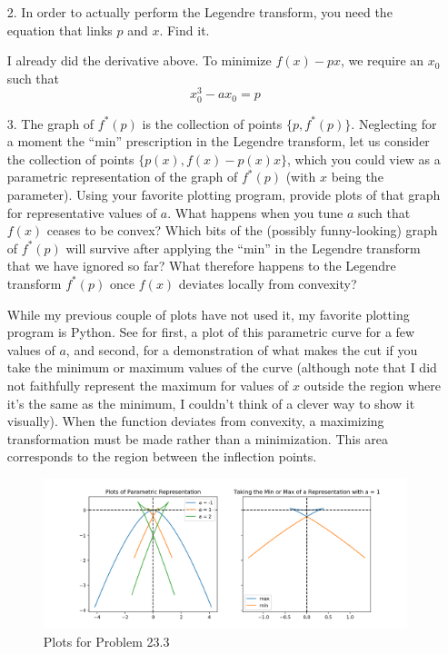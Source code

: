 \documentclass[a4paper,twoside]{article}
\begin{document}
\begin{itemize}
    \item[2.] In order to actually perform the Legendre transform, you need the equation that links $ p $ and $ x $. Find it.
        \begin{problem}
            I already did the derivative above. To minimize $ f(x) - px $, we require an $ x_0 $ such that
            \begin{equation}
                x_0^3 - a x_0 = p
            \end{equation}
        \end{problem}
        
    \item[3.] The graph of $ f^*(p) $ is the collection of points $ \{p, f^*(p)\} $. Neglecting for a moment the ``min'' prescription in the Legendre transform, let us consider the collection of points $ \{p(x), f(x) - p(x) x\} $, which you could view as a parametric representation of the graph of $ f^*(p) $ (with $ x $ being the parameter). Using your favorite plotting program, provide plots of that graph for representative values of $ a $. What happens when you tune $ a $ such that $ f(x) $ ceases to be convex? Which bits of the (possibly funny-looking) graph of $ f^*(p) $ will survive after applying the ``min'' in the Legendre transform that we have ignored so far? What therefore happens to the Legendre transform $ f^*(p) $ once $ f(x) $ deviates locally from convexity?
        \begin{problem}
            While my previous couple of plots have not used it, my favorite plotting program is Python. See  for first, a plot of this parametric curve for a few values of $ a $, and second, for a demonstration of what makes the cut if you take the minimum or maximum values of the curve (although note that I did not faithfully represent the maximum for values of $ x $ outside the region where it's the same as the minimum, I couldn't think of a clever way to show it visually). When the function deviates from convexity, a maximizing transformation must be made rather than a minimization. This area corresponds to the region between the inflection points.
        \end{problem}
        \begin{figure}[h]
            \centering
            \includegraphics[width=\textwidth]{Problem_23_Plots.png}
            \caption{Plots for Problem 23.3}
            \label{fig:problem_23_plots}
        \end{figure}


\end{itemize}
\end{document}
